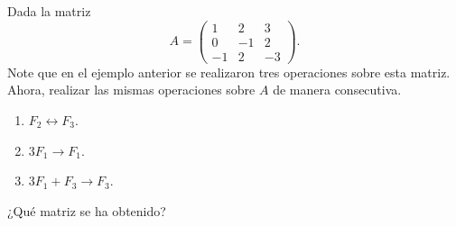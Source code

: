 \documentclass[compacto,10pt]{pubciencias-notas}
\begin{document}
    
    


\begin{ejer}\hspace{0pt}\label{Ejer:OpeELe}   
Dada la matriz
\[
    A=\begin{pmatrix}
           1&2&3 \\
           0&-1&2\\
           -1&2&-3
           \end{pmatrix}.
\]
Note que en el ejemplo anterior se realizaron tres operaciones sobre esta matriz. Ahora, realizar las mismas operaciones sobre $A$ de manera consecutiva. 
\begin{enumerate}
\item $F_{2} \leftrightarrow F_{3}$.
\item $3F_{1} \rightarrow F_{1}$.
\item $3F_{1} + F_{3} \rightarrow F_{3}$.
\end{enumerate}
¿Qué matriz se ha obtenido?
\end{ejer}



\end{document}
